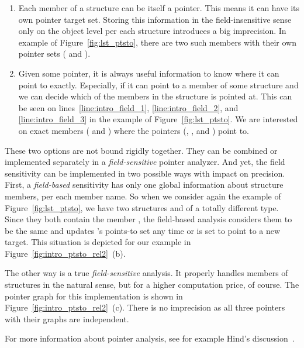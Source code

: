 \begin{enumerate}
\item Each member of a structure can be itself a pointer. This means it can
have its own pointer target set. Storing this information in the
field-insensitive sense only on the object level per each structure introduces
a big imprecision. In example of Figure~\ref{fig:lst_ptsto}, there are two
such members with their own pointer sets ( and ).

\item Given some pointer, it is always useful information to know where it can
point to exactly. Especially, if it can point to a member of some structure
and we can decide which of the members in the structure is pointed at. This
can be seen on lines~\ref{line:intro_field_1}, \ref{line:intro_field_2}, and
\ref{line:intro_field_3} in the example of Figure~\ref{fig:lst_ptsto}. We are
interested on exact members ( and ) where the pointers
(, , and ) point to.

\end{enumerate}

These two options are not bound rigidly together. They can be combined or
implemented separately in a \emph{field-sensitive} pointer analyzer. And yet,
the field sensitivity can be implemented in two possible ways with impact on
precision.  First, a \emph{field-based} sensitivity has only one global
information about structure members, per each member name. So when we consider
again the example of Figure~\ref{fig:lst_ptsto}, we have two structures
 and  of a totally different type. Since they both contain the
member , the field-based analysis considers them to be the same
and updates 's points-to set any time  or  is
set to point to a new target. This situation is depicted for our example in
Figure~\ref{fig:intro_ptsto_rel2}~(b).

The other way is a true \emph{field-sensitive} analysis. It properly handles
members of structures in the natural sense, but for a higher computation
price, of course. The pointer graph for this implementation is shown in
Figure~\ref{fig:intro_ptsto_rel2}~(c). There is no imprecision as all three
pointers with their graphs are independent.

For more information about pointer analysis, see for example Hind's
discussion~\cite{ptr_solved}.

